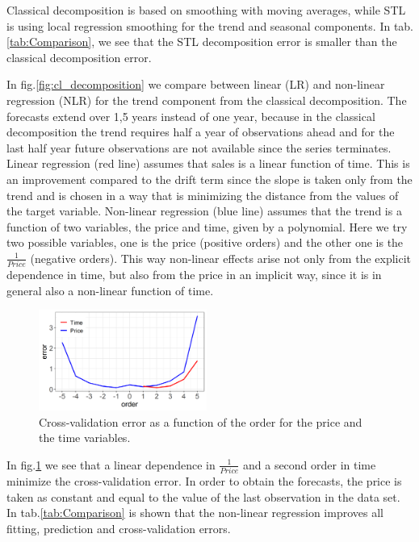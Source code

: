 \documentclass[12pt, letterpaper]{article}\usepackage[]{graphicx}\usepackage[]{color}
\begin{document}
Classical decomposition is based on smoothing with moving averages, while STL is using local regression smoothing for the trend and seasonal components. In tab.\ref{tab:Comparison}, we see that the STL decomposition error is smaller than the classical decomposition error. 

In fig.\ref{fig:cl_decomposition} we compare between linear (LR) and non-linear regression (NLR) for the trend component from the classical decomposition. The forecasts extend over 1,5 years instead of one year, because in the classical decomposition the trend requires half a year of observations ahead and for the last half year future observations are not available since the series terminates. Linear regression (red line) assumes that sales is a linear function of time. This is an improvement compared to the drift term since the slope is taken only from the trend and is chosen in a way that is minimizing the distance from the values of the target variable. Non-linear regression (blue line) assumes that the trend is a function of two variables, the price and time, given by a polynomial. Here we try two possible variables, one is the price (positive orders) and the other one is the $\frac{1}{Price}$ (negative orders). This way non-linear effects arise not only from the explicit dependence in time, but also from the price in an implicit way, since it is in general also a non-linear function of time. 
\begin{figure}
\centering
\includegraphics[width = 0.49\textwidth]{"figures/CV_error_nl.png"}
\caption{Cross-validation error as a function of the order for the price and the time variables.}
\label{fig:CV_error_nl}
\end{figure}
In fig.\ref{fig:CV_error_nl} we see that a linear dependence in $\frac{1}{Price}$ and a second order in time minimize the cross-validation error. In order to obtain the forecasts, the price is taken as constant and equal to the value of the last observation in the data set. In tab.\ref{tab:Comparison} is shown that the non-linear regression improves all fitting, prediction and cross-validation errors. 
\end{document}
